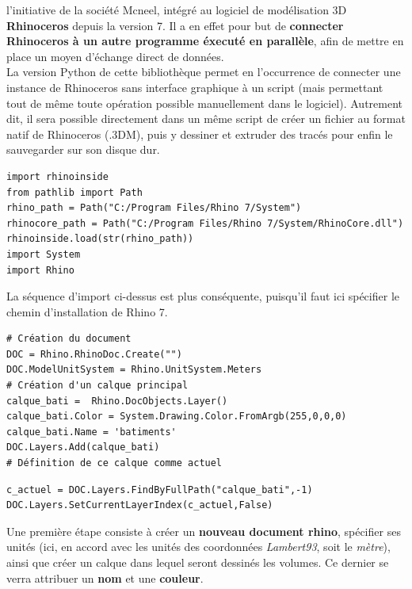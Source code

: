 \documentclass[
  11pt,
  french,
]{article}
\begin{document}
l'initiative de la société Mcneel, intégré au logiciel de modélisation
3D \textbf{Rhinoceros} depuis la version 7. Il a en effet pour but de
\textbf{connecter Rhinoceros à un autre programme éxecuté en parallèle},
afin de mettre en place un moyen d'échange direct de données.\\
La version Python de cette bibliothèque permet en l'occurrence de
connecter une instance de Rhinoceros sans interface graphique à un
script (mais permettant tout de même toute opération possible
manuellement dans le logiciel). Autrement dit, il sera possible
directement dans un même script de créer un fichier au format natif de
Rhinoceros (.3DM), puis y dessiner et extruder des tracés pour enfin le
sauvegarder sur son disque dur.\\

\begin{tcolorbox}[title= Fichier vectoriel organisé des emprises des volumes ,colback=boitecode]
\begin{lstlisting}[style=code]
import rhinoinside
from pathlib import Path
rhino_path = Path("C:/Program Files/Rhino 7/System")
rhinocore_path = Path("C:/Program Files/Rhino 7/System/RhinoCore.dll")
rhinoinside.load(str(rhino_path))
import System
import Rhino\end{lstlisting}
\end{tcolorbox}

La séquence d'import ci-dessus est plus conséquente, puisqu'il faut ici
spécifier le chemin d'installation de Rhino 7.

\begin{tcolorbox}[title= Fichier vectoriel organisé des emprises des volumes ,colback=boitecode]
\begin{lstlisting}[style=code]
# Création du document
DOC = Rhino.RhinoDoc.Create("")
DOC.ModelUnitSystem = Rhino.UnitSystem.Meters
# Création d'un calque principal
calque_bati =  Rhino.DocObjects.Layer()
calque_bati.Color = System.Drawing.Color.FromArgb(255,0,0,0)
calque_bati.Name = 'batiments'
DOC.Layers.Add(calque_bati)
# Définition de ce calque comme actuel\end{lstlisting}
\begin{lstlisting}[style=code]
c_actuel = DOC.Layers.FindByFullPath("calque_bati",-1)
DOC.Layers.SetCurrentLayerIndex(c_actuel,False)\end{lstlisting}
\end{tcolorbox}

Une première étape consiste à créer un \textbf{nouveau document rhino},
spécifier ses unités (ici, en accord avec les unités des coordonnées
\emph{Lambert93}, soit le \emph{mètre}), ainsi que créer un calque dans
lequel seront dessinés les volumes. Ce dernier se verra attribuer un
\textbf{nom} et une \textbf{couleur}.
\end{document}
